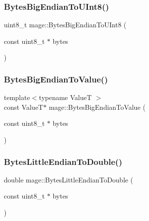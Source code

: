 \hypertarget{namespacemage_a89be63c40055cf211d63423bb25be1cc}{}\label{namespacemage_a89be63c40055cf211d63423bb25be1cc} 
\subsubsection{\texorpdfstring{Bytes\+Big\+Endian\+To\+U\+Int8()}{BytesBigEndianToUInt8()}}
{\footnotesize\ttfamily uint8\+\_\+t mage\+::\+Bytes\+Big\+Endian\+To\+U\+Int8 (\begin{DoxyParamCaption}\item[{const uint8\+\_\+t $\ast$}]{bytes }\end{DoxyParamCaption})}

\hypertarget{namespacemage_a5f6d31e3bcd9b047c2dfe8fa90d4092d}{}\label{namespacemage_a5f6d31e3bcd9b047c2dfe8fa90d4092d} 
\subsubsection{\texorpdfstring{Bytes\+Big\+Endian\+To\+Value()}{BytesBigEndianToValue()}}
{\footnotesize\ttfamily template$<$typename ValueT $>$ \\
const ValueT$\ast$ mage\+::\+Bytes\+Big\+Endian\+To\+Value (\begin{DoxyParamCaption}\item[{const uint8\+\_\+t $\ast$}]{bytes }\end{DoxyParamCaption})}

\hypertarget{namespacemage_a1264a1a92902534e596430b67784869a}{}\label{namespacemage_a1264a1a92902534e596430b67784869a} 
\subsubsection{\texorpdfstring{Bytes\+Little\+Endian\+To\+Double()}{BytesLittleEndianToDouble()}}
{\footnotesize\ttfamily double mage\+::\+Bytes\+Little\+Endian\+To\+Double (\begin{DoxyParamCaption}\item[{const uint8\+\_\+t $\ast$}]{bytes }\end{DoxyParamCaption})}

